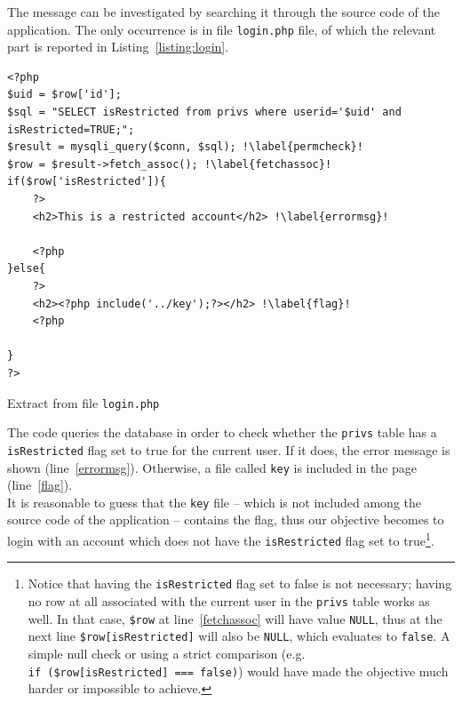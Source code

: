 The message can be investigated by searching it through the source code of the application. The only occurrence is in file \texttt{login.php} file, of which the relevant part is reported in Listing~\ref{listing:login}.

\begin{listing}[H]
\newenvironment{whitetext}{\par\color{white}}{\par}
\begin{whitetext}
\renewcommand{\theFancyVerbLine}{\rmfamily\textcolor{black}{\tiny{\arabic{FancyVerbLine}}}}
\begin{verbatim}
<?php
$uid = $row['id'];
$sql = "SELECT isRestricted from privs where userid='$uid' and isRestricted=TRUE;";
$result = mysqli_query($conn, $sql); !\label{permcheck}!
$row = $result->fetch_assoc(); !\label{fetchassoc}!
if($row['isRestricted']){
    ?>
    <h2>This is a restricted account</h2> !\label{errormsg}!

    <?php
}else{
    ?>
    <h2><?php include('../key');?></h2> !\label{flag}!
    <?php

}
?>
\end{verbatim}
\end{whitetext}
\caption{Extract from file \texttt{login.php}}
\label{listing:login}
\end{listing}

The code queries the database in order to check whether the \texttt{privs} table has a \texttt{isRestricted} flag set to true for the current user. If it does, the error message is shown (line~\ref{errormsg}). Otherwise, a file called \texttt{key} is included in the page (line~\ref{flag}). \\

It is reasonable to guess that the \texttt{key} file -- which is not included among the source code of the application -- contains the flag, thus our objective becomes to login with an account which does not have the \texttt{isRestricted} flag set to true\footnote{Notice that having the \texttt{isRestricted} flag set to false is not necessary; having no row at all associated with the current user in the \texttt{privs} table works as well. In that case, \texttt{\$row} at line~\ref{fetchassoc} will have value \texttt{NULL}, thus at the next line \texttt{\$row[\textquotesingle isRestricted\textquotesingle ]} will also be \texttt{NULL}, which evaluates to \texttt{false}. A simple null check or using a strict comparison (e.g. \texttt{if~(\$row[\textquotesingle isRestricted\textquotesingle ]~===~false)}) would have made the objective much harder or impossible to achieve.}. \\

